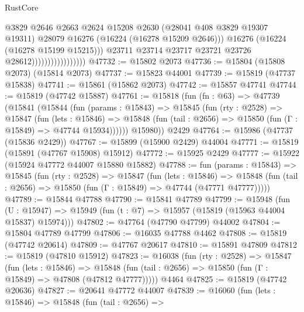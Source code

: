 \begin{lexlean}{RustCore}
\begin{coremodule}
                                          @3829
                                          @2646
                                          @2663
                                          @2624
                                          @15208
                                          @2630
                                          (@28041 @408 @3829 @19307 @19311)
                                          @28079
                                          @16276
                                          (@16224 (@16278 @15209 @2646)))
                                        @16276
                                        (@16224 (@16278 @15199 @15215)))
                                      @23711
                                      @23714
                                      @23717
                                      @23721
                                      @23726
                                      @28612)))))))))))))))))
@47732 := @15802 @2073
@47736 := @15804 (@15808 @2073) (@15814 @2073)
@47737 := @15823 @44001
@47739 := @15819 (@47737 @15838)
@47741 := @15861 (@15862 @2073)
@47742 := @15857 @47741
@47744 := @15819 (@47742 @15887)
@47761 := @15818
    (fun (fn : @63) =>
    @47739
      (@15841
        (@15844
          (fun (params : @15843) =>
          @15845
            (fun (rty : @2528) =>
            @15847
              (fun (lets : @15846) =>
              @15848 (fun (tail : @2656) => @15850 (fun (Γ : @15849) => @47744 @15934))))))
        @15980))
    @2429
@47764 := @15986 (@47737 (@15836 @2429))
@47767 := @15899 (@15900 @2429) @44004
@47771 := @15819 (@15891 (@47767 @15908) @15912)
@47772 := @15925 @2429
@47777 := @15922 (@15924 @47772 @44007 @15880 @15882)
@47788 := fun (params : @15843) =>
  @15845
    (fun (rty : @2528) =>
    @15847
      (fun (lets : @15846) =>
      @15848 (fun (tail : @2656) => @15850 (fun (Γ : @15849) => @47744 (@47771 @47777)))))
@47789 := @15844 @47788
@47790 := @15841 @47789
@47799 := @15948
    (fun (U : @15947) => @15949 (fun (t : @7) => @15957 (@15819 (@15963 @44004 @15837) @15974)))
@47802 := @47764 (@47790 @47799) @44002
@47804 := @15804 @47789 @47799
@47806 := @16035 @47788 @4462
@47808 := @15819 (@47742 @20614)
@47809 := @47767 @20617
@47810 := @15891 @47809
@47812 := @15819 (@47810 @15912)
@47823 := @16038
    (fun (rty : @2528) =>
    @15847
      (fun (lets : @15846) =>
      @15848 (fun (tail : @2656) => @15850 (fun (Γ : @15849) => @47808 (@47812 @47777)))))
    @4464
@47825 := @15819 (@47742 @20636)
@47827 := @20641 @47772 @44007
@47839 := @16060
    (fun (lets : @15846) =>
    @15848
      (fun (tail : @2656) =>

\end{coremodule}
\end{lexlean}
